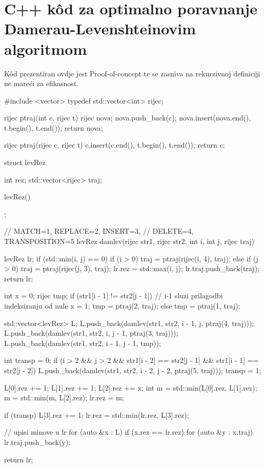 \appendix
\chapter{C++ k\^{o}d za optimalno poravnanje
Damerau-Levenshteinovim algoritmom}
\label{dodatak:levenshtein}

K\^{o}d prezentiran ovdje jest Proof-of-concept te
se zasniva na rekurzivnoj definiciji ne mareći
za efikasnost.

\begin{listing}{0}
#include <vector>
typedef std::vector<int> rijec;

rijec ptraj(int c, rijec t) {
    rijec nova;
    nova.push_back(c);
    nova.insert(nova.end(), t.begin(), t.end());
    return nova;
}

rijec ptraj(rijec c, rijec t) {
    c.insert(c.end(), t.begin(), t.end());
    return c;
}

struct levRez {
    int rez;
    std::vector<rijec> traj;

    levRez() {}
};

// MATCH=1, REPLACE=2, INSERT=3,
// DELETE=4, TRANSPOSITION=5
levRez damlev(rijec str1, rijec str2, int i, int j, rijec traj) {
    levRez lr;
    if (std::min(i, j) == 0) {
        if (i > 0)
            traj = ptraj(rijec(i, 4), traj);
        else if (j > 0)
            traj = ptraj(rijec(j, 3), traj);
        lr.rez = std::max(i, j);
        lr.traj.push_back(traj);
        return lr;
    }

    int x = 0;
    rijec tmp;
    if (str1[i - 1] !=
        str2[j - 1]) { // i-1 sluzi prilagodbi indeksiranju od nule
        x = 1;
        tmp = ptraj(2, traj);
    } else
        tmp = ptraj(1, traj);

    std::vector<levRez> L;
    L.push_back(damlev(str1, str2, i - 1, j, ptraj(4, traj)));
    L.push_back(damlev(str1, str2, i, j - 1, ptraj(3, traj)));
    L.push_back(damlev(str1, str2, i - 1, j - 1, tmp));

    int transp = 0;
    if (i > 2 && j > 2 && str1[i - 2] == str2[j - 1] &&
        str1[i - 1] == str2[j - 2]) {
        L.push_back(damlev(str1, str2, i - 2, j - 2, ptraj(5, traj)));
        transp = 1;
    }

    L[0].rez += 1;
    L[1].rez += 1;
    L[2].rez += x;
    int m = std::min(L[0].rez, L[1].rez);
    m = std::min(m, L[2].rez);
    lr.rez = m;

    if (transp) {
        L[3].rez += 1;
        lr.rez = std::min(lr.rez, L[3].rez);
    }

    // upisi minove u lr
    for (auto &x : L) {
        if (x.rez == lr.rez) {
            for (auto &y : x.traj) {
                lr.traj.push_back(y);
            }
        }
    }

    return lr;
}
\end{listing}
